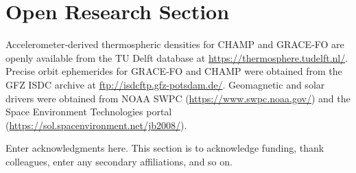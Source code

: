 \documentclass[draft]{agujournal2019}
\begin{document}




%
%

\section*{Open Research Section}
Accelerometer‐derived thermospheric densities for CHAMP and GRACE‐FO are openly available from the TU Delft database \cite{Siemes2023NewGRACE-FO} at \url{https://thermosphere.tudelft.nl/}.
Precise orbit ephemerides for GRACE‐FO and CHAMP were obtained from the GFZ ISDC archive \cite{Schreiner2022GFZProducts} at \url{ftp://isdcftp.gfz-potsdam.de/}.
Geomagnetic and solar drivers were obtained from NOAA SWPC (\url{https://www.swpc.noaa.gov/})
and the Space Environment Technologies portal (\url{https://sol.spacenvironment.net/jb2008/}).

\acknowledgments
Enter acknowledgments here. This section is to acknowledge funding, thank colleagues, enter any secondary affiliations, and so on.

%

%

%

%
%
%
%
%
\end{document}
